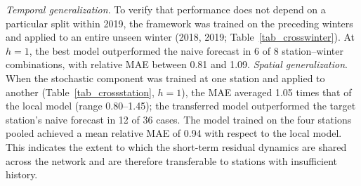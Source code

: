 \textit{Temporal generalization}. To verify that performance does not depend on a particular split within 2019, the framework was trained on the preceding winters and applied to an entire unseen winter (2018, 2019; Table~\ref{tab_crosswinter}). At $h=1$, the best model outperformed the naive forecast in 6 of 8 station--winter combinations, with relative MAE between 0.81 and 1.09. \textit{Spatial generalization}. When the stochastic component was trained at one station and applied to another (Table~\ref{tab_crossstation}, $h=1$), the MAE averaged 1.05 times that of the local model (range 0.80--1.45); the transferred model outperformed the target station's naive forecast in 12 of 36 cases. The model trained on the four stations pooled achieved a mean relative MAE of 0.94 with respect to the local model. This indicates the extent to which the short-term residual dynamics are shared across the network and are therefore transferable to stations with insufficient history.
